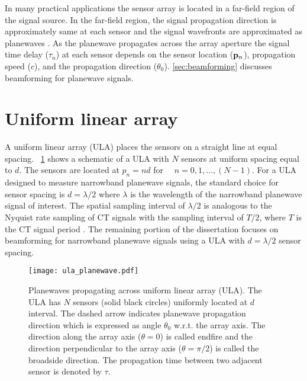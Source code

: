 In many practical applications the sensor array is located in a
far-field region of the signal source. In the far-field region, the
signal propagation direction is approximately same at each sensor and
the signal wavefronts are approximated as planewaves
\cite{johnson1992array}. As the planewave propagates across the array
aperture the signal time delay ($\tau_n$) at each sensor depends on
the sensor location ($\mathbf{p}_n$), propagation speed ($c$), and the
propagation direction ($\theta_0$). \sect{}\ref{sec:beamforming} discusses beamforming for planewave signals.


\section{Uniform linear array}
\label{sec:ula}
A uniform linear array (ULA) places the sensors on a straight line at equal
spacing. \figurename{}~\ref{fig:ula-geom} shows a schematic of a ULA
with $N$ sensors at uniform spacing equal to $d$. The sensors are
located at $p_n = nd$ for $\quad n = 0, 1, \ldots, (N - 1)$. For a ULA
designed to measure narrowband planewave signals, the standard choice
for sensor spacing is $d = \lambda/2$ where $\lambda$ is the wavelength
of the narrowband planewave signal of interest. The spatial sampling
interval of $\lambda/2$ is analogous to the Nyquist rate sampling of
CT signals with the sampling interval of $T/2$, where $T$ is the CT
signal period \cite{Oppenheim1989}. The remaining portion of the dissertation
focuses on beamforming for  narrowband planewave signals using a ULA with $d = \lambda/2$ sensor spacing.
\begin{figure}[!hp]
 \centering
    \texttt{[image: ula\_planewave.pdf]}
    \caption[Planewaves propagating across uniform linear array (ULA)]{Planewaves propagating across uniform linear array (ULA). The ULA has $N$ sensors (solid black circles) uniformly located at $d$ interval. The dashed arrow indicates planewave propagation direction which is expressed as angle $\theta_0$ w.r.t. the array axis. The direction along the array axis ($\theta = 0$) is called endfire and the direction perpendicular to the array axis ($\theta = \pi/2$) is called the broadside direction. The propagation time between two adjacent sensor is denoted by $\tau$.} 
\label{fig:ula-geom}
\end{figure}


